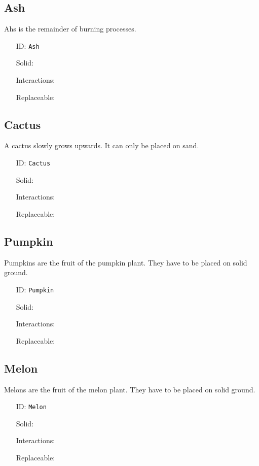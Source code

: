 \subsection{Ash}\label{subsec:blocks_ash}
Ahs is the remainder of burning processes.
\newline
\begin{itemize}[nosep]
\item[ID:] \texttt{Ash}
\item[Solid:]  \Checkmark \item[Interactions:]  \XSolidBrush \item[Replaceable:]  \XSolidBrush \end{itemize}

\subsection{Cactus}\label{subsec:blocks_cactus}
A cactus slowly grows upwards. It can only be placed on sand.
\newline
\begin{itemize}[nosep]
\item[ID:] \texttt{Cactus}
\item[Solid:]  \Checkmark \item[Interactions:]  \XSolidBrush \item[Replaceable:]  \XSolidBrush \end{itemize}

\subsection{Pumpkin}\label{subsec:blocks_pumpkin}
Pumpkins are the fruit of the pumpkin plant. They have to be placed on solid ground.
\newline
\begin{itemize}[nosep]
\item[ID:] \texttt{Pumpkin}
\item[Solid:]  \Checkmark \item[Interactions:]  \XSolidBrush \item[Replaceable:]  \XSolidBrush \end{itemize}

\subsection{Melon}\label{subsec:blocks_melon}
Melons are the fruit of the melon plant. They have to be placed on solid ground.
\newline
\begin{itemize}[nosep]
\item[ID:] \texttt{Melon}
\item[Solid:]  \Checkmark \item[Interactions:]  \XSolidBrush \item[Replaceable:]  \XSolidBrush \end{itemize}

